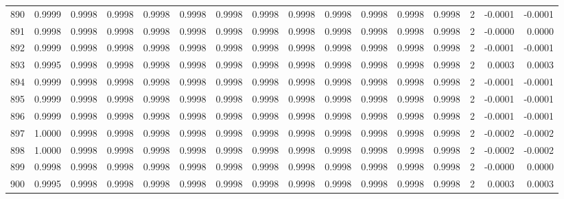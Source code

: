 \begin{tabular}{lrrrrrrrrrrrrrrr}
890 &      0.9999 &  0.9998 &  0.9998 &  0.9998 &  0.9998 &  0.9998 &  0.9998 &  0.9998 &  0.9998 &  0.9998 &   0.9998 &     0.9998 &      2 &                   -0.0001 &                    -0.0001 \\
891 &      0.9998 &  0.9998 &  0.9998 &  0.9998 &  0.9998 &  0.9998 &  0.9998 &  0.9998 &  0.9998 &  0.9998 &   0.9998 &     0.9998 &      2 &                   -0.0000 &                     0.0000 \\
892 &      0.9999 &  0.9998 &  0.9998 &  0.9998 &  0.9998 &  0.9998 &  0.9998 &  0.9998 &  0.9998 &  0.9998 &   0.9998 &     0.9998 &      2 &                   -0.0001 &                    -0.0001 \\
893 &      0.9995 &  0.9998 &  0.9998 &  0.9998 &  0.9998 &  0.9998 &  0.9998 &  0.9998 &  0.9998 &  0.9998 &   0.9998 &     0.9998 &      2 &                    0.0003 &                     0.0003 \\
894 &      0.9999 &  0.9998 &  0.9998 &  0.9998 &  0.9998 &  0.9998 &  0.9998 &  0.9998 &  0.9998 &  0.9998 &   0.9998 &     0.9998 &      2 &                   -0.0001 &                    -0.0001 \\
895 &      0.9999 &  0.9998 &  0.9998 &  0.9998 &  0.9998 &  0.9998 &  0.9998 &  0.9998 &  0.9998 &  0.9998 &   0.9998 &     0.9998 &      2 &                   -0.0001 &                    -0.0001 \\
896 &      0.9999 &  0.9998 &  0.9998 &  0.9998 &  0.9998 &  0.9998 &  0.9998 &  0.9998 &  0.9998 &  0.9998 &   0.9998 &     0.9998 &      2 &                   -0.0001 &                    -0.0001 \\
897 &      1.0000 &  0.9998 &  0.9998 &  0.9998 &  0.9998 &  0.9998 &  0.9998 &  0.9998 &  0.9998 &  0.9998 &   0.9998 &     0.9998 &      2 &                   -0.0002 &                    -0.0002 \\
898 &      1.0000 &  0.9998 &  0.9998 &  0.9998 &  0.9998 &  0.9998 &  0.9998 &  0.9998 &  0.9998 &  0.9998 &   0.9998 &     0.9998 &      2 &                   -0.0002 &                    -0.0002 \\
899 &      0.9998 &  0.9998 &  0.9998 &  0.9998 &  0.9998 &  0.9998 &  0.9998 &  0.9998 &  0.9998 &  0.9998 &   0.9998 &     0.9998 &      2 &                   -0.0000 &                     0.0000 \\
900 &      0.9995 &  0.9998 &  0.9998 &  0.9998 &  0.9998 &  0.9998 &  0.9998 &  0.9998 &  0.9998 &  0.9998 &   0.9998 &     0.9998 &      2 &                    0.0003 &                     0.0003 \\

\end{tabular}
